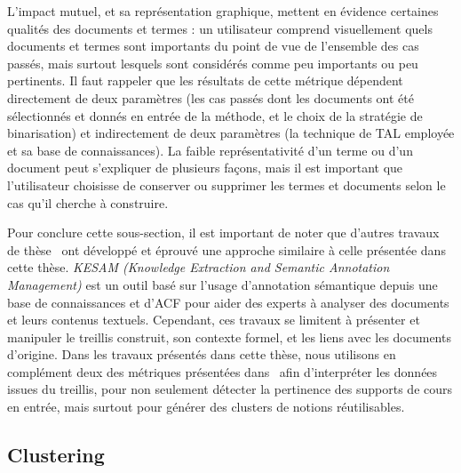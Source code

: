 \bigskip

L'impact mutuel, et sa représentation graphique, mettent en évidence certaines qualités des documents et termes : un utilisateur comprend visuellement quels documents et termes sont importants du point de vue de l'ensemble des cas passés, mais surtout lesquels sont considérés comme peu importants ou peu pertinents.
Il faut rappeler que les résultats de cette métrique dépendent directement de deux paramètres (les cas passés dont les documents ont été sélectionnés et donnés en entrée de la méthode, et le choix de la stratégie de binarisation) et indirectement de deux paramètres (la technique de TAL employée et sa base de connaissances).
La faible représentativité d'un terme ou d'un document peut s'expliquer de plusieurs façons, mais il est important que l'utilisateur choisisse de conserver ou supprimer les termes et documents selon le cas qu'il cherche à construire.



\bigskip

Pour conclure cette sous-section, il est important de noter que d'autres travaux de thèse~\cite{tang2016interactive} ont développé et éprouvé une approche similaire à celle présentée dans cette thèse.
\textit{KESAM (Knowledge Extraction and Semantic Annotation Management)} est un outil basé sur l'usage d'annotation sémantique depuis une base de connaissances et d'ACF pour aider des experts à analyser des documents et leurs contenus textuels.
Cependant, ces travaux se limitent à présenter et manipuler le treillis construit, son contexte formel, et les liens avec les documents d'origine.
Dans les travaux présentés dans cette thèse, nous utilisons en complément deux des métriques présentées dans~\cite{jaffal2019aide} afin d'interpréter les données issues du treillis, pour non seulement détecter la pertinence des supports de cours en entrée, mais surtout pour générer des clusters de notions réutilisables.




\bigskip



\subsection{Clustering}
\label{subsection:Contexte:TechniquesUtilisees:Clustering}

